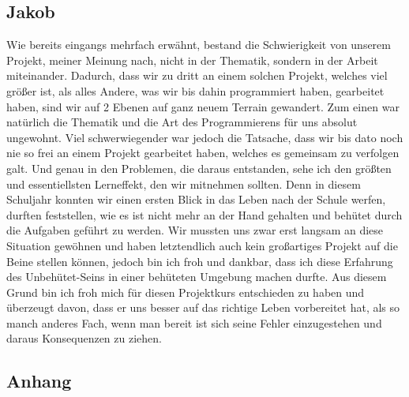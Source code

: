 \documentclass[12pt,a4paper,bibliography=totocnumbered,listof=totocnumbered]{scrartcl}
\begin{document}
\subsection{Jakob}
Wie bereits eingangs mehrfach erwähnt, bestand die Schwierigkeit von unserem Projekt, meiner Meinung nach, nicht in der Thematik, sondern in der Arbeit miteinander. Dadurch, dass wir zu dritt an einem solchen Projekt, welches viel größer ist, als alles Andere, was wir bis dahin programmiert haben, gearbeitet haben, sind wir auf 2 Ebenen auf ganz neuem Terrain gewandert.
Zum einen war natürlich die Thematik und die Art des Programmierens für uns absolut ungewohnt.
Viel schwerwiegender war jedoch die Tatsache, dass wir bis dato noch nie so frei an einem Projekt gearbeitet haben, welches es gemeinsam zu verfolgen galt.
Und genau in den Problemen, die daraus entstanden, sehe ich den größten und essentiellsten Lerneffekt, den wir mitnehmen sollten.
Denn in diesem Schuljahr konnten wir einen ersten Blick in das Leben nach der Schule werfen, durften feststellen, wie es ist nicht mehr an der Hand gehalten und behütet durch die Aufgaben geführt zu werden.
Wir mussten uns zwar erst langsam an diese Situation gewöhnen und haben letztendlich auch kein großartiges Projekt auf die Beine stellen können, jedoch bin ich froh und dankbar, dass ich diese Erfahrung des \glqq Unbehütet-Seins\grqq{} in einer behüteten Umgebung machen durfte.
Aus diesem Grund bin ich froh mich für diesen Projektkurs entschieden zu haben und überzeugt davon, dass er uns besser auf das \glqq richtige Leben\grqq{} vorbereitet hat, als so manch anderes Fach, wenn man bereit ist sich seine Fehler einzugestehen und daraus Konsequenzen zu ziehen.

\pagebreak


\renewcommand\refname{Literaturverzeichnis}


\pagebreak


\setcounter{page}{1}

\begin{appendix}

\section*{Anhang}
{}


\end{appendix}
\end{document}
